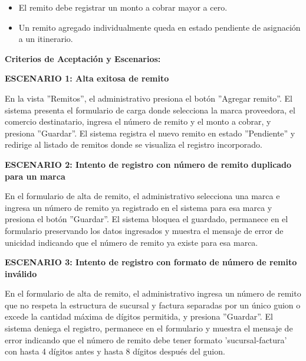 \documentclass[a4paper,9pt]{article}
\begin{document}
\begin{tcolorbox}[hucard, title={\textbf{HU-4: AGREGAR UN REMITO} \hfill \scriptsize \colorbox{tealstatus}{\textbf{\ Accepted\ }} \quad \colorbox{white}{\textcolor{primarydark}{\textbf{\ 3 pts\ }}}}]
{\begin{itemize}[leftmargin=12pt, nosep, itemsep=1.5pt, topsep=1pt]
\item El remito debe registrar un monto a cobrar mayor a cero.
\item Un remito agregado individualmente queda en estado pendiente de asignación a un itinerario.
\end{itemize}
}\par\vspace{3pt}
\noindent\textbf{\footnotesize Criterios de Aceptación y Escenarios:}\par\vspace{2pt}
{\footnotesize
\noindent\textbf{\textcolor{secondarydark}{ESCENARIO 1:  Alta exitosa de remito}}\par\vspace{1pt}
En la vista ''Remitos'', el administrativo presiona el botón ''Agregar remito''. El sistema presenta el formulario de carga donde selecciona la marca proveedora, el comercio destinatario, ingresa el número de remito y el monto a cobrar, y presiona ''Guardar''. El sistema registra el nuevo remito en estado ''Pendiente'' y redirige al listado de remitos donde se visualiza el registro incorporado.\par\vspace{2.5pt}
\noindent\textbf{\textcolor{secondarydark}{ESCENARIO 2:  Intento de registro con número de remito duplicado para un marca}}\par\vspace{1pt}
En el formulario de alta de remito, el administrativo selecciona una marca e ingresa un número de remito ya registrado en el sistema para esa marca y presiona el botón ''Guardar''. El sistema bloquea el guardado, permanece en el formulario preservando los datos ingresados y muestra el mensaje de error de unicidad indicando que el número de remito ya existe para esa marca.\par\vspace{2.5pt}
\noindent\textbf{\textcolor{secondarydark}{ESCENARIO 3:  Intento de registro con formato de número de remito inválido}}\par\vspace{1pt}
En el formulario de alta de remito, el administrativo ingresa un número de remito que no respeta la estructura de sucursal y factura separadas por un único guion o excede la cantidad máxima de dígitos permitida, y presiona ''Guardar''. El sistema deniega el registro, permanece en el formulario y muestra el mensaje de error indicando que el número de remito debe tener formato 'sucursal-factura' con hasta 4 dígitos antes y hasta 8 dígitos después del guion.\par\vspace{2.5pt}
}
\end{tcolorbox}
\end{document}

